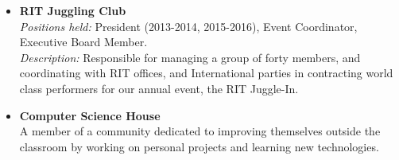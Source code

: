 \documentclass[10pt]{article}
\begin{document}
\vspace{1ex}
\begin{itemize} [topsep=1ex, itemsep=.25ex, partopsep=0ex, parsep=1ex]
	\item[] {\bf RIT Juggling Club}\\
	{\it Positions held:}  President (2013-2014, 2015-2016), Event Coordinator, Executive Board Member.\\
	{\it Description:} Responsible for managing a group of forty members, and coordinating with RIT offices, and International parties in contracting world class performers for our annual event, the RIT Juggle-In.
	\item[]{\bf Computer Science House}\\
	A member of a community dedicated to improving themselves outside the classroom by working on personal projects and learning new technologies.
\end{itemize}
\end{document}
